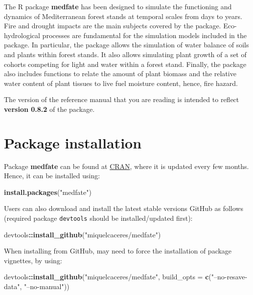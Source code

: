 \documentclass[]{book}
\newenvironment{Shaded}{\begin{snugshade}}{\end{snugshade}}
\newcommand{\KeywordTok}[1]{\textcolor[rgb]{0.13,0.29,0.53}{\textbf{#1}}}
\newcommand{\DataTypeTok}[1]{\textcolor[rgb]{0.13,0.29,0.53}{#1}}
\newcommand{\StringTok}[1]{\textcolor[rgb]{0.31,0.60,0.02}{#1}}
\newcommand{\OperatorTok}[1]{\textcolor[rgb]{0.81,0.36,0.00}{\textbf{#1}}}
\newcommand{\NormalTok}[1]{#1}
\begin{document}
The R package \textbf{medfate} has been designed to simulate the functioning and dynamics of Mediterranean forest stands at temporal scales from days to years. Fire and drought impacts are the main subjects covered by the package. Eco-hydrological processes are fundamental for the simulation models included in the package. In particular, the package allows the simulation of water balance of soils and plants within forest stands. It also allows simulating plant growth of a set of cohorts competing for light and water within a forest stand. Finally, the package also includes functions to relate the amount of plant biomass and the relative water content of plant tissues to live fuel moisture content, hence, fire hazard.

The version of the reference manual that you are reading is intended to reflect \textbf{version 0.8.2} of the package.

\hypertarget{package-installation}{%
\section{Package installation}\label{package-installation}}

Package \textbf{medfate} can be found at \href{https://CRAN.R-project.org/package=medfate}{CRAN}, where it is updated every few months. Hence, it can be installed using:

\begin{Shaded}
\begin{Highlighting}[]
\KeywordTok{install.packages}\NormalTok{(}\StringTok{"medfate"}\NormalTok{)}
\end{Highlighting}
\end{Shaded}

Users can also download and install the latest stable versions GitHub as follows (required package \texttt{devtools} should be installed/updated first):

\begin{Shaded}
\begin{Highlighting}[]
\NormalTok{devtools}\OperatorTok{::}\KeywordTok{install_github}\NormalTok{(}\StringTok{"miquelcaceres/medfate"}\NormalTok{)}
\end{Highlighting}
\end{Shaded}

When installing from GitHub, may need to force the installation of package vignettes, by using:

\begin{Shaded}
\begin{Highlighting}[]
\NormalTok{devtools}\OperatorTok{::}\KeywordTok{install_github}\NormalTok{(}\StringTok{"miquelcaceres/medfate"}\NormalTok{, }
                         \DataTypeTok{build_opts =} \KeywordTok{c}\NormalTok{(}\StringTok{"--no-resave-data"}\NormalTok{, }\StringTok{"--no-manual"}\NormalTok{))}
\end{Highlighting}
\end{Shaded}
\end{document}
